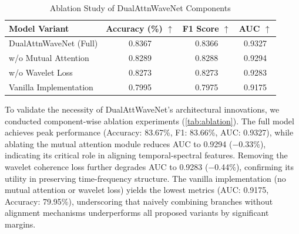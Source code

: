 \documentclass[10pt,twocolumn]{article}
\begin{document}
\begin{table}[htbp]
    \caption{Ablation Study of DualAttnWaveNet Components}
    \label{tab:ablation}
    \centering
    \begin{tabular}{lccc}
        \toprule
        \textbf{Model Variant} & \textbf{Accuracy (\%)} $\uparrow$ & \textbf{F1 Score} $\uparrow$ & \textbf{AUC} $\uparrow$ \\
        \midrule
        DualAttnWaveNet (Full) & 0.8367                            & 0.8366                       & 0.9327                  \\
        \cmidrule{1-4}
        w/o Mutual Attention   & 0.8289                            & 0.8288                       & 0.9294                  \\
        w/o Wavelet Loss       & 0.8273                            & 0.8273                       & 0.9283                  \\
        Vanilla Implementation & 0.7995                            & 0.7975                       & 0.9175                  \\
        \bottomrule
    \end{tabular}
    \vspace{2pt}

\end{table}

To validate the necessity of DualAttWaveNet’s architectural innovations, we conducted component-wise ablation experiments (\autoref{tab:ablation}). The full model achieves peak performance (Accuracy: 83.67\%, F1: 83.66\%, AUC: 0.9327), while ablating the mutual attention module reduces AUC to 0.9294 (−0.33\%), indicating its critical role in aligning temporal-spectral features. Removing the wavelet coherence loss further degrades AUC to 0.9283 (−0.44\%), confirming its utility in preserving time-frequency structure. The vanilla implementation (no mutual attention or wavelet loss) yields the lowest metrics (AUC: 0.9175, Accuracy: 79.95\%), underscoring that naively combining branches without alignment mechanisms underperforms all proposed variants by significant margins.




\printbibliography
\end{document}
